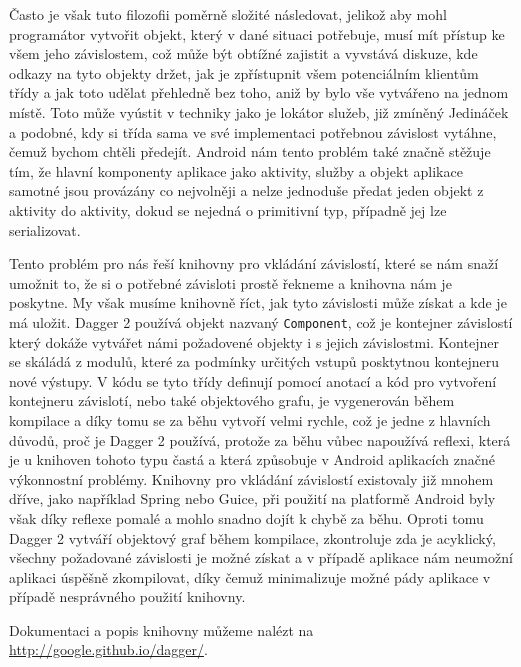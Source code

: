 \documentclass{article}
\begin{document}
Často je však tuto filozofii poměrně složité následovat, jelikož aby mohl programátor vytvořit objekt, který
v dané situaci potřebuje, musí mít přístup ke všem jeho závislostem, což může být obtížné zajistit
a vyvstává diskuze, kde odkazy na tyto objekty držet, jak je zpřístupnit všem potenciálním klientům třídy
a jak toto udělat přehledně bez toho, aniž by bylo vše vytvářeno na jednom místě. Toto může vyústit v techniky
jako je lokátor služeb, již zmíněný Jedináček a podobné, kdy si třída sama ve své implementaci potřebnou
závislost vytáhne, čemuž bychom chtěli předejít.
Android nám tento problém také značně stěžuje tím, že hlavní komponenty aplikace jako aktivity, služby a objekt
aplikace samotné jsou provázány co nejvolněji a nelze jednoduše předat jeden objekt z aktivity do aktivity,
dokud se nejedná o primitivní typ, případně jej lze serializovat.

Tento problém pro nás řeší knihovny pro vkládání závislostí, které se nám snaží umožnit to, že si o potřebné
závisloti prostě řekneme a knihovna nám je poskytne. My však musíme knihovně říct, jak tyto závislosti může
získat a kde je má uložit. Dagger 2 používá objekt nazvaný \texttt{Component}, což je kontejner závislostí
který dokáže vytvářet námi požadovené objekty i s jejich závislostmi. Kontejner se skáládá z modulů, které
za podmínky určitých vstupů posktytnou kontejneru nové výstupy. V kódu se tyto třídy definují pomocí anotací
a kód pro vytvoření kontejneru závislotí, nebo také objektového grafu, je vygenerován během kompilace
a díky tomu se za běhu vytvoří velmi rychle, což je jedne z hlavních důvodů, proč je Dagger 2 používá,
protože za běhu vůbec napoužívá reflexi, která je u knihoven tohoto typu častá a která způsobuje v Android
aplikacích značné výkonnostní problémy. Knihovny pro vkládání závislostí existovaly již mnohem dříve,
jako například Spring nebo Guice, při použití na platformě Android byly však díky reflexe pomalé a mohlo snadno
dojít k chybě za běhu. Oproti tomu Dagger 2 vytváří objektový graf během kompilace, zkontroluje zda je acyklický,
všechny požadované závislosti je možné získat a v případě aplikace nám neumožní aplikaci úspěšně zkompilovat,
díky čemuž minimalizuje možné pády aplikace v případě nesprávného použití knihovny.

Dokumentaci a popis knihovny můžeme nalézt na \url{http://google.github.io/dagger/}.
\end{document}
